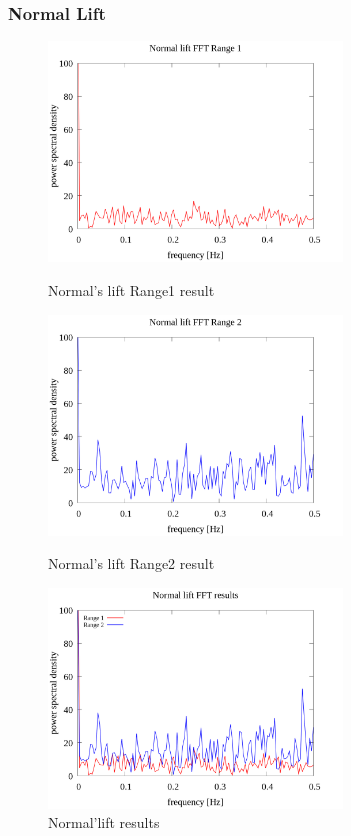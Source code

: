 \documentclass[twocolumn,a4j]{jsarticle}
\begin{document}
\subsubsection{Normal Lift}
\begin{figure}[htbp]
    \footnotesize
    \begin{center}
        \includegraphics[width=78mm]{../images/Normal_lift_06.png}
        \caption{Normal's lift Range1 result}
        \includegraphics[width=78mm]{../images/Normal_lift_07.png}
        \caption{Normal's lift Range2 result}
        \includegraphics[width=78mm]{../images/Normal_lift_08.png}
        \caption{Normal'lift results}
    \end{center}
\end{figure}
\newpage
\end{document}
